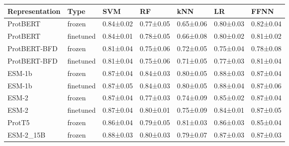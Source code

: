 \begin{tabular}{lllllll}
\toprule
Representation &      Type &       SVM &        RF &       kNN &        LR &      FFNN \\
\midrule
      ProtBERT &    frozen & 0.84±0.02 & 0.77±0.05 & 0.65±0.06 & 0.80±0.03 & 0.82±0.04 \\
      ProtBERT & finetuned & 0.84±0.01 & 0.78±0.05 & 0.66±0.08 & 0.80±0.02 & 0.81±0.02 \\
  ProtBERT-BFD &    frozen & 0.81±0.04 & 0.75±0.06 & 0.72±0.05 & 0.75±0.04 & 0.78±0.08 \\
  ProtBERT-BFD & finetuned & 0.81±0.04 & 0.75±0.06 & 0.71±0.05 & 0.77±0.03 & 0.81±0.04 \\
        ESM-1b &    frozen & 0.87±0.04 & 0.84±0.03 & 0.80±0.05 & 0.88±0.03 & 0.87±0.04 \\
        ESM-1b & finetuned & 0.87±0.05 & 0.84±0.03 & 0.80±0.05 & 0.88±0.04 & 0.87±0.06 \\
         ESM-2 &    frozen & 0.87±0.04 & 0.77±0.03 & 0.74±0.09 & 0.85±0.02 & 0.87±0.04 \\
         ESM-2 & finetuned & 0.87±0.04 & 0.80±0.01 & 0.75±0.09 & 0.84±0.01 & 0.87±0.05 \\
        ProtT5 &    frozen & 0.86±0.04 & 0.79±0.05 & 0.81±0.03 & 0.86±0.03 & 0.85±0.04 \\
     ESM-2_15B &    frozen & 0.88±0.03 & 0.80±0.03 & 0.79±0.07 & 0.87±0.03 & 0.87±0.03 \\
\bottomrule
\end{tabular}
